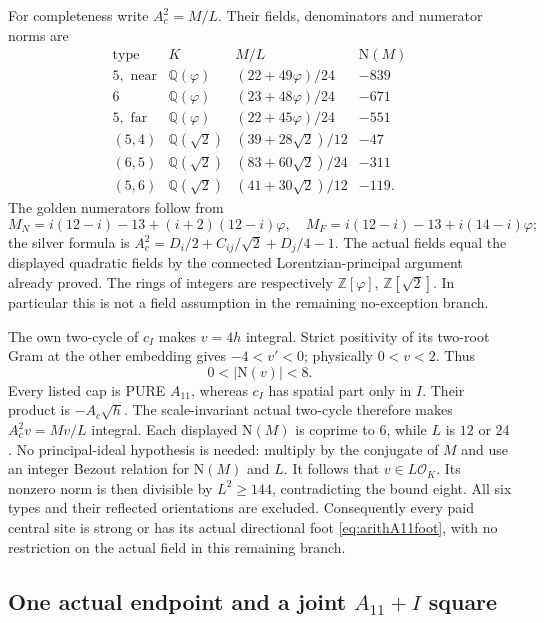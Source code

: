 For completeness write \(A_c^2=M/L\).
Their fields, denominators and numerator
norms are
\[
 \begin{array}{c|c|c|r}
 \text{type}&K&M/L&\mathrm N(M)\\ \hline
 5,\text{ near}&\mathbb Q(\varphi)&(22+49\varphi)/24&-839\\
 6&\mathbb Q(\varphi)&(23+48\varphi)/24&-671\\
 5,\text{ far}&\mathbb Q(\varphi)&(22+45\varphi)/24&-551\\
 (5,4)&\mathbb Q(\sqrt2)&(39+28\sqrt2)/12&-47\\
 (6,5)&\mathbb Q(\sqrt2)&(83+60\sqrt2)/24&-311\\
 (5,6)&\mathbb Q(\sqrt2)&(41+30\sqrt2)/12&-119 .
 \end{array}
\]
The golden numerators follow from
\[
 M_N=i(12-i)-13+(i+2)(12-i)\varphi,\quad
 M_F=i(12-i)-13+i(14-i)\varphi;
\]
the silver formula is
\(A_c^2=D_i/2+C_{ij}/\sqrt2+D_j/4-1\).
The actual fields equal the displayed quadratic
fields by the connected Lorentzian-principal
argument already proved.
The rings of integers are respectively
\(\mathbb Z[\varphi]\), \(\mathbb Z[\sqrt2]\).
In particular this is not a field assumption
in the remaining no-exception branch.

The own two-cycle of \(c_I\) makes
\(v=4h\) integral.
Strict positivity of its two-root Gram at the
other embedding gives \(-4<v'<0\);
physically \(0<v<2\).
Thus
\[
                        0<|\mathrm N(v)|<8 .
\]
Every listed cap is PURE \(A_{11}\), whereas
\(c_I\) has spatial part only in \(I\).
Their product is \(-A_c\sqrt h\).
The scale-invariant actual two-cycle therefore
makes \(A_c^2v=Mv/L\) integral.
Each displayed \(\mathrm N(M)\) is coprime
to \(6\), while \(L\) is \(12\) or \(24\).
No principal-ideal hypothesis is needed:
multiply by the conjugate of \(M\) and use
an integer Bezout relation for
\(\mathrm N(M)\) and \(L\).
It follows that \(v\in L\mathcal O_K\).
Its nonzero norm is then divisible by
\(L^2\ge144\), contradicting the bound eight.
All six types and their reflected orientations
are excluded.
Consequently every paid central site is
strong or has its actual directional foot
\eqref{eq:arithA11foot}, with no restriction
on the actual field in this remaining branch.

\subsection{One actual endpoint and a joint \(A_{11}+I\) square}
\label{app:arithA11Ijoint}

